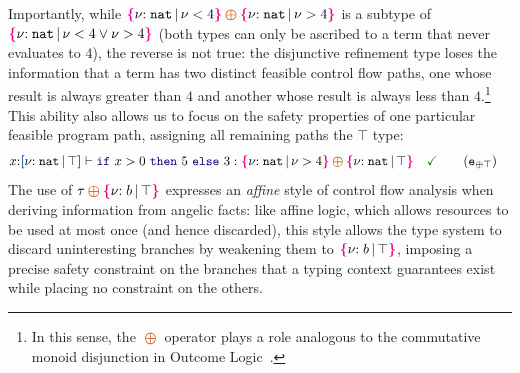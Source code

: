 Importantly, while
$\ort{\Nat}{\vnu < 4} \ctoplus \ort{\Nat}{\vnu > 4}$ is a subtype of
$\textcolor{magenta}{\mbox{\rm\textbf{\{}}} { {\nu}{:}\;{{\tt nat}}\, |\, {\nu < 4 \lor \nu > 4} } \textcolor{magenta}{\mbox{\rm\textbf{\}}}}$ (both types can only be ascribed
to a term that never evaluates to $4$), the reverse is not true: the
disjunctive refinement type loses the information that a term has two
distinct feasible control flow paths, one whose result is always
greater than $4$ and another whose result is always less than
$4$.\footnote{In this
  sense, the $\ctoplus$  operator plays a role analogous to the commutative
  monoid disjunction in Outcome Logic~\cite{ZDS23}.} This ability also
allows us to focus on the safety properties of one particular feasible
program path, assigning all remaining paths the $\top$ type: %
\vspace{-0.2em}
\begin{align*}
  &x{:}\urt{\Nat}{\top} \vdash \zif{x > 0}{5}{3} : \ort{\Nat}{\vnu >
    4} \ctoplus \ort{\Nat}{\top} \quad \judgok
    \tag{\Code{e}$_{\oplus\top}$}\label{ex:oplusWeak}
\end{align*}\noindent
The use of $\tau \ctoplus \ort{b}{\top}$ expresses an \emph{affine}
style of control flow analysis when deriving information from angelic
facts: like affine logic, which allows resources to be used at most
once (and hence discarded), this style allows the type system to
discard uninteresting branches by weakening them to $\textcolor{magenta}{\mbox{\rm\textbf{\{}}} { {\nu}{:}\;{b}\, |\, {\top} } \textcolor{magenta}{\mbox{\rm\textbf{\}}}}$,
imposing a precise safety constraint on the branches that a typing
context guarantees exist while placing no constraint on the others.



